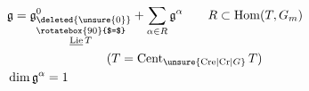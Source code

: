 \[
\begin{aligned}
&\mathfrak g=\underset{\substack{\rotatebox{90}{$=$}\\\underline{\mathrm{Lie}}\,T}}{\mathfrak g^{0}_{\deleted{\unsure{0}}}}
 +\sum_{\alpha\in R}\mathfrak g^\alpha
 \qquad R\subset\mathrm{Hom}(T,G_m)\\
&\hspace{8em}(T=\mathrm{Cent}_{\unsure{\mathrm{Cre}|\mathrm{Cr}|G}}\,T)\\
&\dim\mathfrak g^\alpha=1
\end{aligned}
\]

